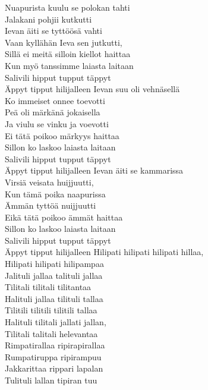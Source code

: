 
Nuapurista kuulu se polokan tahti\\
Jalakani pohjii kutkutti\\
Ievan äiti se tyttöösä vahti\\
Vaan kyllähän Ieva sen jutkutti,\\
Sillä ei meitä silloin kiellot haittaa\\
Kun myö tanssimme laiasta laitaan\\
Salivili hipput tupput täppyt\\
Äppyt tipput hilijalleen
\hop
Ievan suu oli vehnäsellä\\
Ko immeiset onnee toevotti\\
Peä oli märkänä jokaisella\\
Ja viulu se vinku ja voevotti\\
Ei tätä poikoo märkyys haittaa\\
Sillon ko laskoo laiasta laitaan\\
Salivili hipput tupput täppyt\\
Äppyt tipput hilijalleen
\hop
Ievan äiti se kammarissa\\
Virsiä veisata huijjuutti,\\
Kun tämä poika naapurissa\\
Ämmän tyttöä nuijjuutti\\
Eikä tätä poikoo ämmät haittaa\\
Sillon ko laskoo laiasta laitaan\\
Salivili hipput tupput täppyt\\
Äppyt tipput hilijalleen
\hop
Hilipati hilipati hilipati hillaa,\\
Hilipati hilipati hilipampaa\\
Jalituli jallaa talituli jallaa\\
Tilitali tilitali tilitantaa\\
Halituli jallaa tilituli tallaa\\
Tilitili tilitili tilitili tallaa\\
Halituli tilitali jallati jallan,\\
Tilitali talitali helevantaa\\
\hop
Rimpatirallaa ripirapirallaa\\
Rumpatiruppa ripirampuu\\
Jakkarittaa rippari lapalan\\
Tulituli lallan tipiran tuu\\
